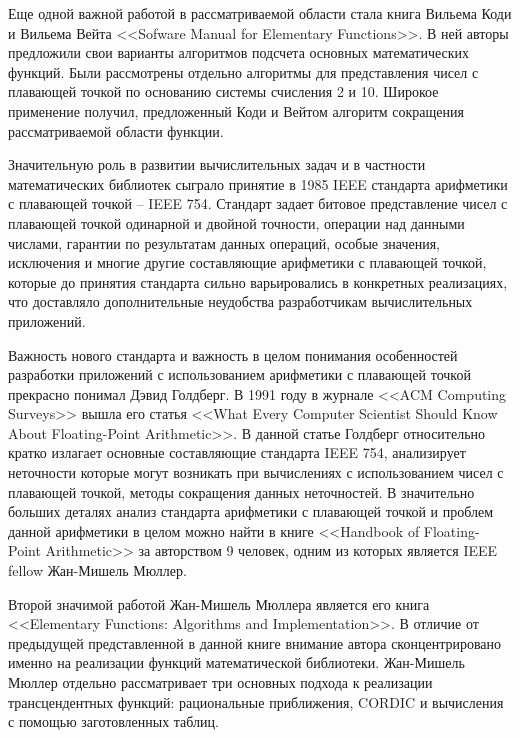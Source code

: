 Еще одной важной работой в рассматриваемой области стала книга Вильема Коди и Вильема Вейта <<\foreignlanguage{english}{Sofware Manual for Elementary Functions}>>\cite{cody-waite}.
В ней авторы предложили свои варианты алгоритмов подсчета основных математических функций.
Были рассмотрены отдельно алгоритмы для представления чисел с плавающей точкой по основанию системы счисления 2 и 10.
Широкое применение получил, предложенный Коди и Вейтом алгоритм сокращения рассматриваемой области функции.

Значительную роль в развитии вычислительных задач и в частности математических библиотек сыграло принятие в 1985 IEEE стандарта арифметики с плавающей точкой -- IEEE 754\cite{ieee754}.
Стандарт задает битовое представление чисел с плавающей точкой одинарной и двойной точности, операции над данными числами, гарантии по результатам данных операций, особые значения, исключения и многие другие составляющие арифметики с плавающей точкой, которые  до принятия стандарта сильно варьировались в конкретных реализациях, что доставляло дополнительные неудобства разработчикам вычислительных приложений.

Важность нового стандарта и важность в целом понимания особенностей разработки приложений с использованием арифметики с плавающей точкой прекрасно понимал Дэвид Голдберг.
В 1991 году в журнале <<\foreignlanguage{english}{ACM Computing Surveys}>> вышла его статья <<\foreignlanguage{english}{What Every Computer Scientist Should Know About Floating-Point Arithmetic}>>.
В данной статье Голдберг относительно кратко излагает основные составляющие стандарта IEEE 754, анализирует неточности которые могут возникать при вычислениях с использованием чисел с плавающей точкой, методы сокращения данных неточностей.
В значительно больших деталях анализ стандарта арифметики с плавающей точкой и проблем данной арифметики в целом можно найти в книге <<\foreignlanguage{english}{Handbook of Floating-Point Arithmetic}>>\cite{muller-fp} за авторством 9 человек, одним из которых является \foreignlanguage{english}{IEEE fellow} Жан-Мишель Мюллер.

Второй значимой работой Жан-Мишель Мюллера является его книга <<\foreignlanguage{english}{Elementary Functions: Algorithms and Implementation}>>.
В отличие от предыдущей представленной в данной книге внимание автора сконцентрировано именно на реализации функций математической библиотеки.
Жан-Мишель Мюллер отдельно рассматривает три основных подхода к реализации трансцендентных функций: рациональные приближения, CORDIC и вычисления с помощью заготовленных таблиц.

